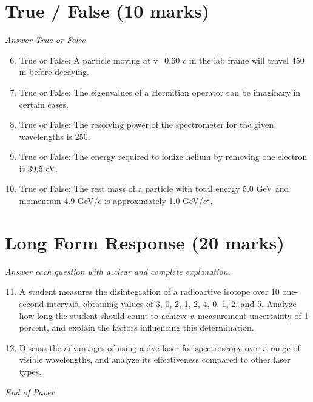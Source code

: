 \documentclass[12pt]{article}
\begin{document}
\section*{True / False (10 marks)}
\textit{Answer True or False}
\begin{enumerate}[label=\arabic*.]
\setcounter{enumi}{5}
\item True or False: A particle moving at v=0.60 c in the lab frame will travel 450 m before decaying.
\item True or False: The eigenvalues of a Hermitian operator can be imaginary in certain cases.
\item True or False: The resolving power of the spectrometer for the given wavelengths is 250.
\item True or False: The energy required to ionize helium by removing one electron is 39.5 eV.
\item True or False: The rest mass of a particle with total energy 5.0 GeV and momentum 4.9 GeV/c is approximately 1.0 GeV/$c^2$.
\end{enumerate}

\section*{Long Form Response (20 marks)}
\textit{Answer each question with a clear and complete explanation.}
\begin{enumerate}[label=\arabic*.]
\setcounter{enumi}{10}
\item A student measures the disintegration of a radioactive isotope over 10 one-second intervals, obtaining values of 3, 0, 2, 1, 2, 4, 0, 1, 2, and 5. Analyze how long the student should count to achieve a measurement uncertainty of 1 percent, and explain the factors influencing this determination.
\item Discuss the advantages of using a dye laser for spectroscopy over a range of visible wavelengths, and analyze its effectiveness compared to other laser types.
\end{enumerate}

\vfill
\noindent\textit{End of Paper}
\end{document}
